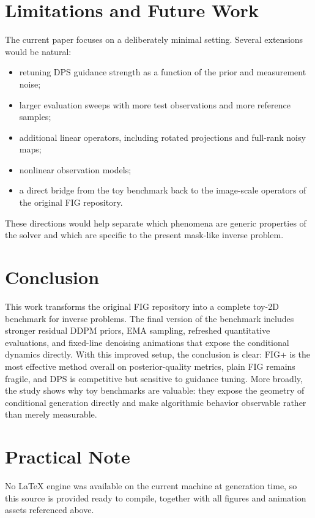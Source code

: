 \documentclass[10pt,twocolumn]{article}
\begin{document}
\section{Limitations and Future Work}

The current paper focuses on a deliberately minimal setting. Several extensions would be natural:
\begin{itemize}[leftmargin=1.5em]
    \item retuning DPS guidance strength as a function of the prior and measurement noise;
    \item larger evaluation sweeps with more test observations and more reference samples;
    \item additional linear operators, including rotated projections and full-rank noisy maps;
    \item nonlinear observation models;
    \item a direct bridge from the toy benchmark back to the image-scale operators of the original FIG repository.
\end{itemize}

These directions would help separate which phenomena are generic properties of the solver and which are specific to the present mask-like inverse problem.

\section{Conclusion}

This work transforms the original FIG repository into a complete toy-2D benchmark for inverse problems. The final version of the benchmark includes stronger residual DDPM priors, EMA sampling, refreshed quantitative evaluations, and fixed-line denoising animations that expose the conditional dynamics directly. With this improved setup, the conclusion is clear: FIG+ is the most effective method overall on posterior-quality metrics, plain FIG remains fragile, and DPS is competitive but sensitive to guidance tuning. More broadly, the study shows why toy benchmarks are valuable: they expose the geometry of conditional generation directly and make algorithmic behavior observable rather than merely measurable.

\section*{Practical Note}

No LaTeX engine was available on the current machine at generation time, so this source is provided ready to compile, together with all figures and animation assets referenced above.
\end{document}

